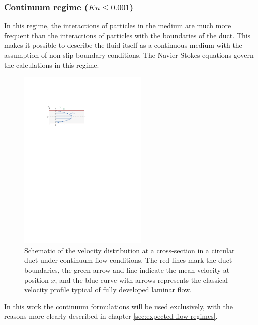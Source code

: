 \subsubsection*{Continuum regime (\(Kn \leq 0.001\))}
	In this regime, the interactions of particles in the medium are much more frequent than the interactions of particles with the boundaries of the duct.
	This makes it possible to describe the fluid itself as a continuous medium with the assumption of non-slip boundary conditions.
	The Navier-Stokes equations govern the calculations in this regime.
	\begin{figure}[H]
	    \centering
	    \includegraphics[width=0.55\textwidth]{src/02_foundations/fig_continuum-regime.pdf}
		\caption{
			Schematic of the velocity distribution at a cross-section in a circular duct under continuum flow conditions.
			The red lines mark the duct boundaries, the green arrow and line indicate the mean velocity at position $x$, and the blue curve with arrows represents the classical velocity profile typical of fully developed laminar flow. \cite{Cengel2017}
		}
		\label{fig:non-slip-flow}
	\end{figure}

	In this work the continuum formulations will be used exclusively, with the reasons more clearly described in chapter \ref{sec:expected-flow-regimes}.
	\cite{rapp2017microfluidics, putignano2012supersonic, halwidl_development_2016, leishman_internal_2023}
